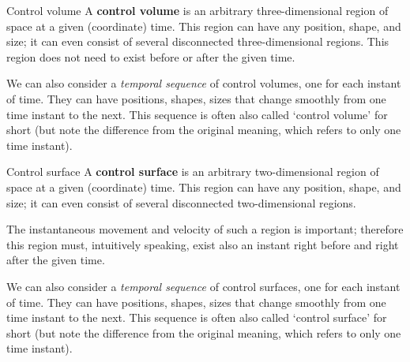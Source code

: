 \documentclass[a4paper,12pt,%
onecolumn,oneside,%
british%
]{memoir}
\renewcommand*{\|}[1][]{\nonscript\:#1\vert\nonscript\:\mathopen{}}
\begin{document}
\begin{definition}{Control volume}
  A \textbf{control volume} is an arbitrary three-dimensional region of space at a given (coordinate) time. This region can have any position, shape, and size; it can even consist of several disconnected three-dimensional regions. This region does not need to exist before or after the given time.

  \smallskip

  We can also consider a \emph{temporal sequence} of control volumes, one for each instant of time. They can have positions, shapes, sizes that change smoothly from one time instant to the next. This sequence is often also called \enquote*{control volume} for short (but note the difference from the original meaning, which refers to only one time instant).
\end{definition}
\begin{definition}{Control surface}
  A \textbf{control surface} is an arbitrary two-dimensional region of space at a given (coordinate) time. This region can have any position, shape, and size; it can even consist of several disconnected two-dimensional regions.

  \smallskip

  The instantaneous movement and velocity of such a region is important; therefore this region must, intuitively speaking, exist also an instant right before and right after the given time.

  \smallskip

  We can also consider a \emph{temporal sequence} of control surfaces, one for each instant of time. They can have positions, shapes, sizes that change smoothly from one time instant to the next. This sequence is often also called \enquote*{control surface} for short (but note the difference from the original meaning, which refers to only one time instant).
\end{definition}
\end{document}
